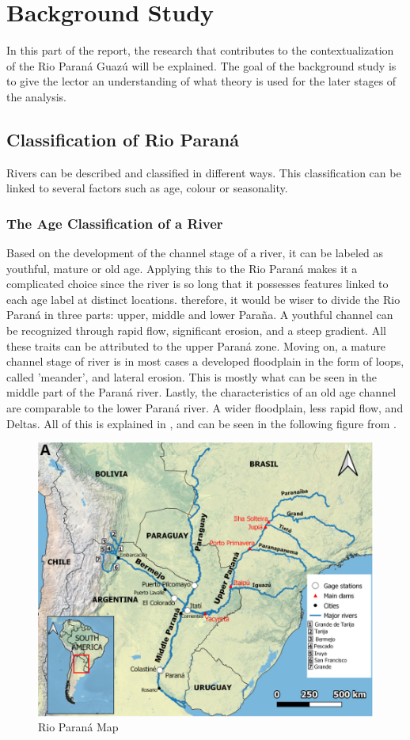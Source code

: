 \chapter{Background Study}
In this part of the report, the research that contributes to the contextualization of the Rio Paraná Guazú will be explained. The goal of the background study is to give the lector an understanding of what theory is used for the later stages of the analysis.

\section{Classification of Rio Paraná}

Rivers can be described and classified in different ways. This classification can be linked to several factors such as age, colour or seasonality. 

\subsection{The Age Classification of a River}
Based on the development of the channel stage of a river, it can be labeled as youthful, mature or old age.  \autocite{davis_geographical_1899}
Applying this to the Rio Paraná makes it a complicated choice since the river is so long that it possesses features linked to each age label at distinct locations. therefore, it would be wiser to divide the Rio Paraná in three parts: upper, middle and lower Paraña. A youthful channel can be recognized through rapid flow, significant erosion, and a steep gradient. All these traits can be attributed to the upper Paraná zone.
Moving on, a mature channel stage of river is in most cases a developed floodplain in the form of loops, called 'meander', and lateral erosion. This is mostly what can be seen in the middle part of the Paraná river.
Lastly, the characteristics of an old age channel are comparable to the lower Paraná river. A wider floodplain, less rapid flow, and Deltas. All of this is explained in \autocite{orfeo_parana_2023}, and can be seen in the following figure from \autocite{lopez_weibel_sources_2022}.



\begin{figure}[H]
    \centering
    \includegraphics[width=0.5\linewidth]{figure chap 2/map rio parana.png}
    \caption{Rio Paraná Map}
    \label{fig:placeholder}
\end{figure}


